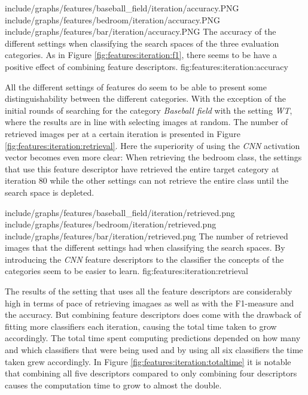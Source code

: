 \tripfigurenear
{include/graphs/features/baseball_field/iteration/accuracy.PNG}
{include/graphs/features/bedroom/iteration/accuracy.PNG}
{include/graphs/features/bar/iteration/accuracy.PNG}
{The accuracy of the different settings when classifying the search spaces of the three evaluation categories. As in Figure \ref{fig:features:iteration:f1}, there seems to be have a positive effect of combining feature descriptors.}
{fig:features:iteration:accuracy}


All the different settings of features do seem to be able to present some distinguishability between the different categories. With the exception of the initial rounds of searching for the category \emph{Baseball field} with the setting \emph{WT}, where the results are in line with selecting images at random. The number of retrieved images per at a certain iteration is presented in Figure \ref{fig:features:iteration:retrieval}. Here the superiority of using the \emph{CNN} activation vector becomes even more clear: When retrieving the bedroom class, the settings that use this feature descriptor have retrieved the entire target category at iteration 80 while the other settings can not retrieve the entire class until the search space is depleted. 

\tripfigurenear
{include/graphs/features/baseball_field/iteration/retrieved.png}
{include/graphs/features/bedroom/iteration/retrieved.png}
{include/graphs/features/bar/iteration/retrieved.png}
{The number of retrieved images that the different settings had when classifying the search spaces. By introducing the \emph{CNN} feature descriptors to the classifier the concepts of the categories seem to be easier to learn.}
{fig:features:iteration:retrieval}


The results of the setting that uses all the feature descriptors are considerably high in terms of pace of retrieving imagaes as well as with the F1-measure and the accuracy. But combining feature descriptors does come with the drawback of fitting more classifiers each iteration, causing the total time taken to grow accordingly.
The total time spent computing predictions depended on how many and which classifiers that were being used and by using all six classifiers the time taken grew accordingly. In Figure \ref{fig:features:iteration:totaltime} it is notable that combining all five descriptors compared to only combining four descriptors causes the computation time to grow to almost the double. 

